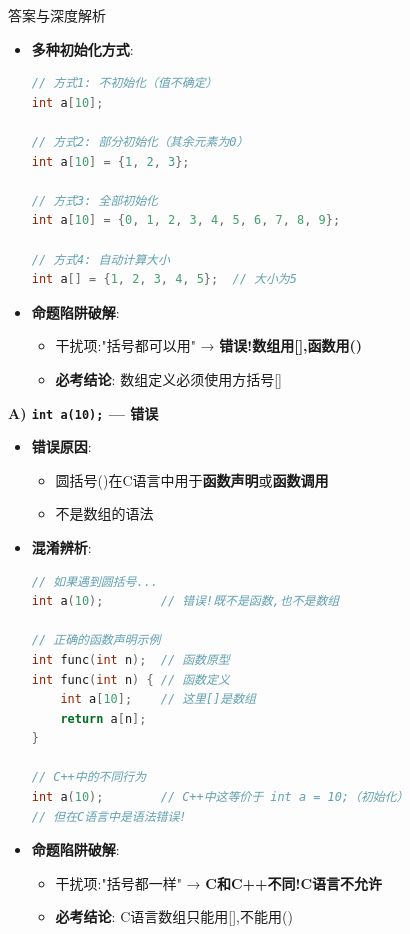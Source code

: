 \documentclass[a4paper,12pt]{article}
\begin{document}
\begin{bluebox}{答案与深度解析}
\begin{itemize}[leftmargin=*, nosep]
		\item \textbf{多种初始化方式}:
		      \begin{lstlisting}[language=C]
// 方式1: 不初始化（值不确定）
int a[10];

// 方式2: 部分初始化（其余元素为0）
int a[10] = {1, 2, 3};

// 方式3: 全部初始化
int a[10] = {0, 1, 2, 3, 4, 5, 6, 7, 8, 9};

// 方式4: 自动计算大小
int a[] = {1, 2, 3, 4, 5};  // 大小为5
    \end{lstlisting}

		\item \textbf{命题陷阱破解}:
		      \begin{itemize}
			      \item 干扰项:"括号都可以用" → \textbf{错误!数组用[],函数用()}
			      \item \textbf{必考结论}: 数组定义必须使用方括号[]
		      \end{itemize}
	\end{itemize}

	\textbf{A) \texttt{int a(10);} — 错误}
	\begin{itemize}[leftmargin=*, nosep]
		\item \textbf{错误原因}:
		      \begin{itemize}
			      \item 圆括号()在C语言中用于\textbf{函数声明}或\textbf{函数调用}
			      \item 不是数组的语法
		      \end{itemize}

		\item \textbf{混淆辨析}:
		      \begin{lstlisting}[language=C]
// 如果遇到圆括号...
int a(10);        // 错误!既不是函数,也不是数组

// 正确的函数声明示例
int func(int n);  // 函数原型
int func(int n) { // 函数定义
    int a[10];    // 这里[]是数组
    return a[n];
}

// C++中的不同行为
int a(10);        // C++中这等价于 int a = 10;（初始化）
// 但在C语言中是语法错误!
    \end{lstlisting}

		\item \textbf{命题陷阱破解}:
		      \begin{itemize}
			      \item 干扰项:"括号都一样" → \textbf{C和C++不同!C语言不允许}
			      \item \textbf{必考结论}: C语言数组只能用[],不能用()
		      \end{itemize}
	\end{itemize}


\end{bluebox}
\end{document}

